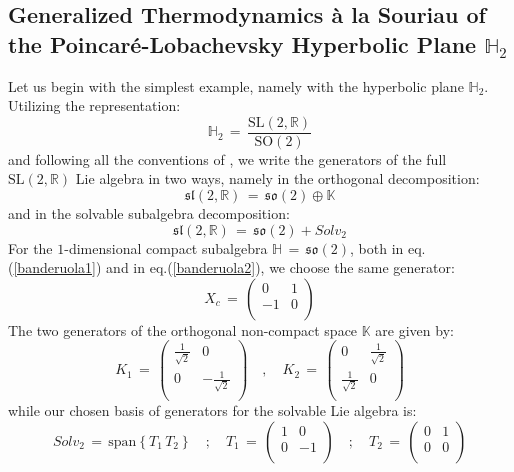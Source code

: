 \documentclass[10pt,a4paper]{article}
\newcommand{\so}{\mathfrak{so}}
\newcommand{\slal}{\mathfrak{sl}}
\begin{document}
\subsection{Generalized Thermodynamics {\`a} la Souriau of the Poincar\'e-Lobachevsky Hyperbolic Plane $\mathbb{H}_2$}
 Let us begin with the simplest example, namely with the hyperbolic plane $\mathbb{H}_2$. Utilizing the representation:
 \begin{equation}\label{hyperplane}
   \mathbb{H}_{2}\, = \, \frac{\mathrm{SL(2,\mathbb{R})}}{\mathrm{SO(2)}}
 \end{equation}
 and following all the conventions of \cite{pgtstheory}, we write the generators of the full
  $\mathrm{SL(2,\mathbb{R})}$ Lie algebra  in two ways, namely in the orthogonal decomposition:
 \begin{equation}\label{banderuola1}
   \slal(2,\mathbb{R})\, = \, \so(2) \oplus \mathbb{K}
 \end{equation}
 and in the solvable subalgebra decomposition:
 \begin{equation}\label{banderuola2}
   \slal(2,\mathbb{R})\, = \, \so(2) + Solv_2
 \end{equation}
  For the $1$-dimensional compact subalgebra $\mathbb{H}\, = \, \so(2)$, both in eq.(\ref{banderuola1}) and in eq.(\ref{banderuola2}), we choose the same generator:
 \begin{equation}\label{Xcompact}
   X_c \, = \, \left(
\begin{array}{cc}
 0 & 1 \\
 -1 & 0 \\
\end{array}
\right)
 \end{equation}
The two generators of the orthogonal non-compact space $\mathbb{K}$ are given by:
 \begin{equation}\label{tafferuglio}
   K_1 \, = \, \left(
\begin{array}{cc}
 \frac{1}{\sqrt{2}} & 0 \\
 0 & -\frac{1}{\sqrt{2}} \\
\end{array}
\right) \quad , \quad K_2 \, = \, \left(
\begin{array}{cc}
 0 & \frac{1}{\sqrt{2}} \\
 \frac{1}{\sqrt{2}} & 0 \\
\end{array}
\right)
 \end{equation}
 while our chosen basis of generators for the solvable Lie algebra is:
 \begin{equation}\label{sodacaustica}
   Solv_2\, = \, \text{span}\left\{T_1\,T_2\right\}\quad ; \quad T_1 \, = \, \left(
\begin{array}{cc}
 1 & 0 \\
 0 & -1 \\
\end{array}
\right) \quad ; \quad T_2 \, = \, \left(
\begin{array}{cc}
 0 & 1 \\
 0 & 0 \\
\end{array}
\right)
 \end{equation}
\end{document}
